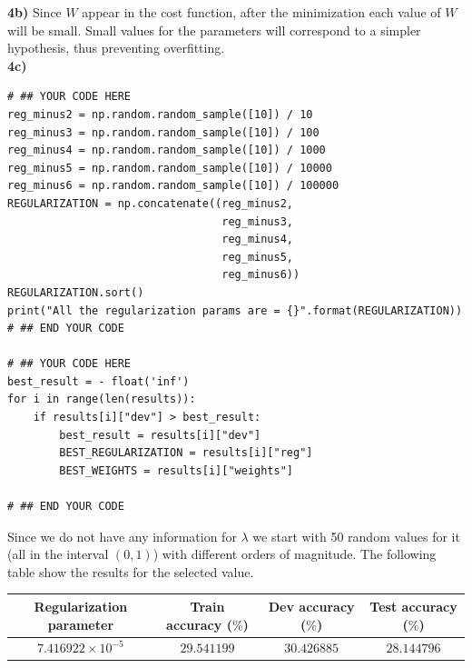 \documentclass{article}
\begin{document}
\textbf{4b)} Since $W$ appear in the cost function, after the minimization  each value of $W$ will be small. Small values for the parameters will correspond to a simpler hypothesis, thus preventing overfitting. \\

\textbf{4c)}
\begin{verbatim}
# ## YOUR CODE HERE
reg_minus2 = np.random.random_sample([10]) / 10
reg_minus3 = np.random.random_sample([10]) / 100
reg_minus4 = np.random.random_sample([10]) / 1000
reg_minus5 = np.random.random_sample([10]) / 10000
reg_minus6 = np.random.random_sample([10]) / 100000
REGULARIZATION = np.concatenate((reg_minus2,
                                 reg_minus3,
                                 reg_minus4,
                                 reg_minus5,
                                 reg_minus6))
REGULARIZATION.sort()
print("All the regularization params are = {}".format(REGULARIZATION))
# ## END YOUR CODE

# ## YOUR CODE HERE
best_result = - float('inf')
for i in range(len(results)):
    if results[i]["dev"] > best_result:
        best_result = results[i]["dev"]
        BEST_REGULARIZATION = results[i]["reg"]
        BEST_WEIGHTS = results[i]["weights"]

# ## END YOUR CODE
\end{verbatim}

Since we do not have any information for $\lambda$ we start with 50 random values for it (all in the interval $(0,1)$) with different orders of magnitude. The following table show the results for the selected value.

\begin{center}
\begin{tabular}{|c|c|c|c|}
\hline
\rowcolor{blue!20}
Regularization parameter & Train accuracy ($\%$) & Dev accuracy ($\%$) & Test accuracy ($\%$)\\ \hline
$7.416922 \times 10^{-5}$ & $29.541199$ & $30.426885$ & $28.144796$\\ \hline
\end{tabular}
\end{center}

\pagebreak
\end{document}
